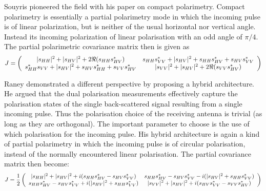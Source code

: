 Souyris \cite{Souyris_2005_TGRS} pioneered the field with his paper on compact polarimetry.
Compact polarimetry is essentially a partial polarimetry mode in which the incoming pulse is of linear polarization, 
	but is neither of the usual horizontal nor vertical angle.
Instead its incoming polarization of linear polarisation with an odd angle of $\pi/4$.
The partial polarimetric covariance matrix then is given as
\begin{equation}
J = 
\left(	
\begin{array}{c c}
	|s_{HH}|^2 + |s_{HV}|^2 + 2 \Re{(s_{HH}s_{HV}^*)}
& 	s_{HH}s_{VV}^* + |s_{HV}|^2 + s_{HH}s_{HV}^* + s_{HV}s_{VV}^*\\
	s_{HH}^*s_{VV} + |s_{HV}|^2 + s_{HV}s_{HH}^* + s_{VV}s_{HV}^*
& 	|s_{VV}|^2 + |s_{HV}|^2 + 2 \Re{(s_{VV}s_{HV}^*)}
\end{array}
\right)
\end{equation}

Raney \cite{Raney_2006_IGARSS} demonstrated a different perspective by proposing a hybrid architecture.
He argued that the dual polarisation measurements effectively capture the polarisation states of the single back-scattered signal resulting from a single incoming pulse.
Thus the polarisation choice of the receiving antenna is trivial (as long as they are orthogonal).
The important parameter to choose is the use of which polarisation for the incoming pulse.
His hybrid architecture is again a kind of partial polarimetry in which the incoming pulse is of circular polarisation, instead of the normally encountered linear polarisation.
The partial covariance matrix then become:
\begin{equation}
J = \frac{1}{2} \left(	
\begin{array}{c c}
	|s_{HH}|^2 + |s_{HV}|^2 + i (s_{HH}s_{HV}^* - s_{HV}s_{VV}^*)
& 	s_{HH}s_{HV}^* - s_{HV}s_{VV}^* - i (|s_{HV}|^2 + s_{HH}s_{VV}^*)\\
	s_{HH}s_{HV}^* - s_{HV}s_{VV}^* + i (|s_{HV}|^2 + s_{HH}s_{VV}^*)
& 	|s_{VV}|^2 + |s_{HV}|^2 + i (s_{HV}s_{VV}^* - s_{VV}s_{HV}^*)
\end{array}
\right)
\end{equation}

